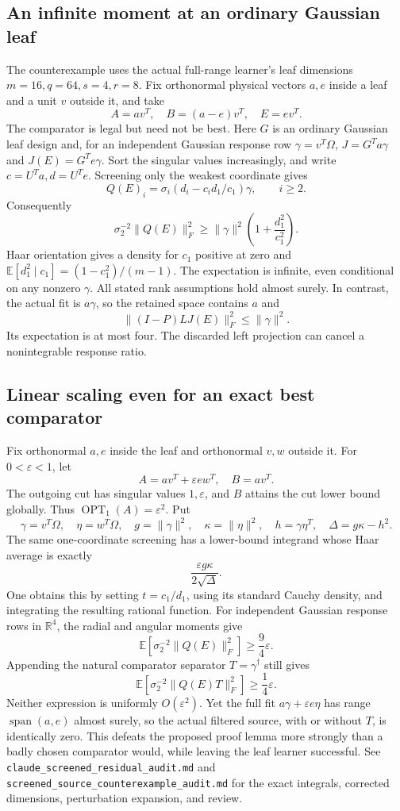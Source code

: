 \documentclass[11pt,oneside,openany,a4paper]{report}
\numberwithin{equation}{chapter}
\theoremstyle{definition}
\theoremstyle{remark}
\newcommand{\sourcefile}[1]{{\small\nolinkurl{#1}}}
\begin{document}
\subsection{An infinite moment at an ordinary Gaussian leaf}

The counterexample uses the actual full-range learner's leaf dimensions
$m=16,q=64,s=4,r=8$.  Fix orthonormal physical vectors $a,e$ inside a
leaf and a unit $v$ outside it, and take
\[
 A=av^T,\quad B=(a-e)v^T,\quad E=ev^T.
\]
The comparator is legal but need not be best.  Here $G$ is an ordinary
Gaussian leaf design and, for an independent Gaussian response row
$\gamma=v^T\Omega$,
$J=G^Ta\gamma$ and $J(E)=G^Te\gamma$.
Sort the singular values increasingly, and write
$c=U^Ta,d=U^Te$.  Screening only the weakest coordinate gives
\[
 Q(E)_i=\sigma_i(d_i-c_i d_1/c_1)\gamma,
 \qquad i\ge2.
\]
Consequently
\[
 \sigma_2^{-2}\|Q(E)\|_F^2
 \ge\|\gamma\|^2\left(1+\frac{d_1^2}{c_1^2}\right).
\]
Haar orientation gives a density for $c_1$ positive at zero and
$\mathbb E[d_1^2\mid c_1]=(1-c_1^2)/(m-1)$.  The expectation is
infinite, even conditional on any nonzero $\gamma$.  All stated rank
assumptions hold almost surely.  In contrast, the actual fit is
$a\gamma$, so the retained space contains $a$ and
\[
 \|(I-P)LJ(E)\|_F^2\le\|\gamma\|^2.
\]
Its expectation is at most four.  The discarded left projection can
cancel a nonintegrable response ratio.

\subsection{Linear scaling even for an exact best comparator}

Fix orthonormal $a,e$ inside the leaf and orthonormal $v,w$ outside it.
For $0<\varepsilon<1$, let
\[
 A=av^T+\varepsilon ew^T,\quad B=av^T.
\]
The outgoing cut has singular values $1,\varepsilon$, and $B$ attains
the cut lower bound globally.  Thus
$\operatorname{OPT}_1(A)=\varepsilon^2$.  Put
\[
 \gamma=v^T\Omega,\quad \eta=w^T\Omega,\quad
 g=\|\gamma\|^2,\quad \kappa=\|\eta\|^2,\quad
 h=\gamma\eta^T,\quad \Delta=g\kappa-h^2.
\]
The same one-coordinate screening has a lower-bound integrand whose
Haar average is exactly
\[
 \frac{\varepsilon g\kappa}{2\sqrt\Delta}.
\]
One obtains this by setting $t=c_1/d_1$, using its standard Cauchy
density, and integrating the resulting rational function.  For
independent Gaussian response rows in $\mathbb R^4$, the radial and
angular moments give
\[
 \mathbb E[\sigma_2^{-2}\|Q(E)\|_F^2]
 \ge\frac94\varepsilon.
\]
Appending the natural comparator separator $T=\gamma^\dagger$ still
gives
\[
 \mathbb E[\sigma_2^{-2}\|Q(E)T\|_F^2]
 \ge\frac14\varepsilon.
\]
Neither expression is uniformly $O(\varepsilon^2)$.  Yet the full fit
$a\gamma+\varepsilon e\eta$ has range $\operatorname{span}(a,e)$
almost surely, so the actual filtered source, with or without $T$, is
identically zero.  This defeats the proposed proof lemma more strongly
than a badly chosen comparator would, while leaving the leaf learner
successful.  See \sourcefile{claude_screened_residual_audit.md} and
\sourcefile{screened_source_counterexample_audit.md} for the exact
integrals, corrected dimensions, perturbation expansion, and review.
\end{document}
